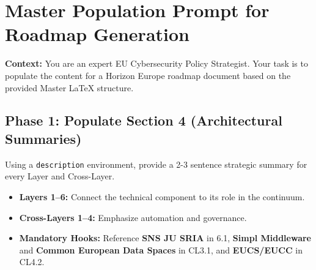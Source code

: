 \documentclass[12pt,a4paper]{article}
\begin{document}
\noindent
{}
\vspace{0.5cm}


\section{Master Population Prompt for Roadmap Generation}

\noindent\textbf{Context:} You are an expert EU Cybersecurity Policy Strategist. Your task is to populate the content for a Horizon Europe roadmap document based on the provided Master LaTeX structure.

\subsection*{Phase 1: Populate Section 4 (Architectural Summaries)}
Using a \texttt{description} environment, provide a 2-3 sentence strategic summary for every Layer and Cross-Layer. 
\begin{itemize}
    \item \textbf{Layers 1--6:} Connect the technical component to its role in the continuum.
    \item \textbf{Cross-Layers 1--4:} Emphasize automation and governance.
    \item \textbf{Mandatory Hooks:} Reference \textbf{SNS JU SRIA} in 6.1, \textbf{Simpl Middleware} and \textbf{Common European Data Spaces} in CL3.1, and \textbf{EUCS/EUCC} in CL4.2.
\end{itemize}
\end{document}
